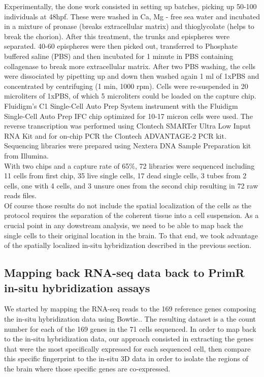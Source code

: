 	Experimentally, the done work consisted in setting up \platy{} batches, picking up 50-100 individuals at 48hpf. These were washed in Ca, Mg - free sea water and incubated in a mixture of pronase (breaks extracellular matrix) and thioglycolate (helps to break the chorion). After this treatment, the trunks and epispheres were separated. 40-60 epispheres were then picked out, transferred to Phosphate buffered saline (PBS) and then incubated for 1 minute in PBS containing collagenase to break more extracellular matrix. After two PBS washing, the cells were dissociated by pipetting up and down then washed again 1 ml of 1xPBS and concentrated by centrifuging (1 min, 1000 rpm). Cells were re-suspended in 20 microliters of 1xPBS, of which 5 microliters could be loaded on the capture chip.\\

	Fluidigm's C1 Single-Cell Auto Prep System instrument with the Fluidigm Single-Cell Auto Prep IFC chip optimized for 10-17 micron cells were used. The reverse transcription was performed using Clontech SMARTer Ultra Low Input RNA Kit and for on-chip PCR the Clontech ADVANTAGE-2 PCR kit. Sequencing libraries were prepared using Nextera DNA Sample Preparation kit from Illumina.\\

	With two chips and a capture rate of 65\%, 72 libraries were sequenced including 11 cells from first chip, 35 live single cells, 17 dead single cells, 3 tubes from 2 cells, one with 4 cells, and 3 unsure ones from the second chip resulting in 72 raw reads files.\\	
  	
	Of course those results do not include the spatial localization of the cells as the protocol requires the separation of the coherent tissue into a cell suspension. As a crucial point in any dowstream analysis, we need to be able to map back the single cells to their original location in the brain. To that end, we took advantage of the spatially localized in-situ hybridization described in the previous section.\\

  \subsection{Mapping back RNA-seq data back to PrimR in-situ hybridization assays}
  	We started by mapping the RNA-seq reads to the 169 reference genes composing the in-situ hybridization data using Bowtie.. The resulting dataset is a the count number for each of the 169 genes in the 71 cells sequenced. In order to map back to the in-situ hybridization data, our approach consisted in extracting the genes that were the most specifically expressed for each sequenced cell, then compare this specific fingerprint to the in-situ 3D data in order to isolate the regions of the brain where those specific genes are co-expressed.\\
	
